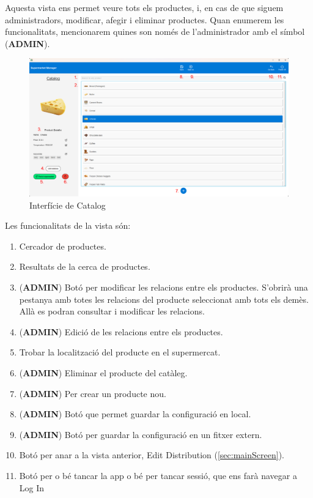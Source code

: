 \documentclass[a4paper,12pt]{article}
\begin{document}
	Aquesta vista ens permet veure tots els productes, i, en cas de que siguem administradors, modificar, afegir i eliminar productes. Quan enumerem les funcionalitats, mencionarem quines son només de l'administrador amb el símbol (\textbf{ADMIN}).
	
	\begin{figure}[H] 
		\centering
		\includegraphics[width=0.75\linewidth]{assets/catalog.png}
		\caption{Interfície de Catalog}
	\end{figure}
	
	\noindent Les funcionalitats de la vista són:
	
	\begin{enumerate}[itemsep=0pt, topsep=0pt]
		\item Cercador de productes.
		\item Resultats de la cerca de productes.
		\item (\textbf{ADMIN}) Botó per modificar les relacions entre els productes. S'obrirà una pestanya amb totes les relacions del producte seleccionat amb tots els demès. Allà es podran consultar i modificar les relacions.
		\item (\textbf{ADMIN}) Edició de les relacions entre els productes.
		\item Trobar la localització del producte en el supermercat.
		\item (\textbf{ADMIN}) Eliminar el producte del catàleg.
		\item (\textbf{ADMIN}) Per crear un producte nou.
		\item (\textbf{ADMIN}) Botó que permet guardar la configuració en local.
		\item (\textbf{ADMIN}) Botó per guardar la configuració en un fitxer extern.
		\item Botó per anar a la vista anterior, Edit Distribution (\ref{sec:mainScreen}).
		\item Botó per o bé tancar la app o bé per tancar sessió, que ens farà navegar a Log In
	\end{enumerate}
	
\end{document}
